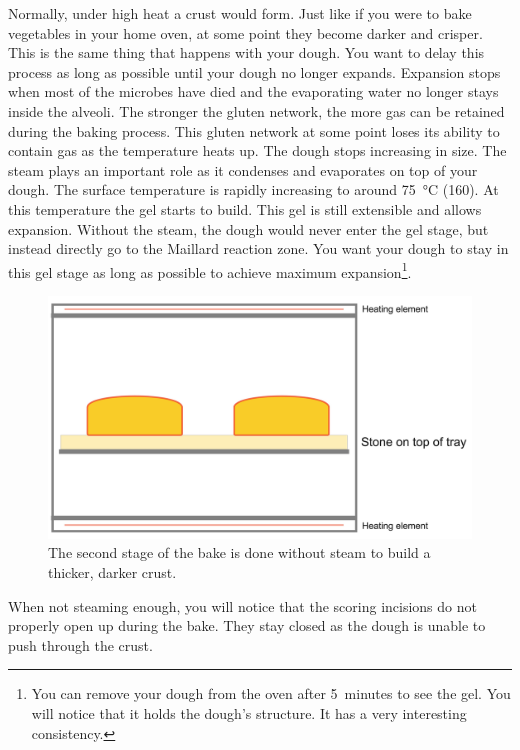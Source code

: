 Normally, under high heat a crust would form. Just like
if you were to bake vegetables in your home oven, at some point
they become darker and crisper. This is the same thing that
happens with your dough. You want to delay this process
as long as possible until your dough no longer expands.
Expansion stops when most of the microbes have died and
the evaporating water no longer stays inside the alveoli.
The stronger the gluten network, the more gas can be retained
during the baking process. This gluten network at some point
loses its ability to contain gas as the temperature heats
up. The dough stops increasing in size. The steam plays
an important role as it condenses and evaporates on top
of your dough. The surface temperature is rapidly increasing
to around  \qty{75}{\degreeCelsius} (\qty{160}{\degF}). At this temperature the gel starts
to build. This gel is still extensible and allows expansion.
Without the steam, the dough would never enter the gel stage,
but instead directly go to the Maillard reaction zone. You
want your dough to stay in this gel stage as long as possible
to achieve maximum expansion\footnote{You can remove your
dough from the oven after 5~minutes to see the gel. You will notice
that it holds the dough's structure. It has a very interesting consistency.}.

\begin{figure}[!htb]
  \includegraphics[width=\textwidth]{baking-process-stage-2.jpg}
  \caption[Baking step~2, without steam]{The second stage of the bake is done
      without steam to build a thicker, darker crust.}
\end{figure}

When not steaming enough, you will notice that the scoring
incisions do not properly open up during the bake. They stay
closed as the dough is unable to push through the crust.

